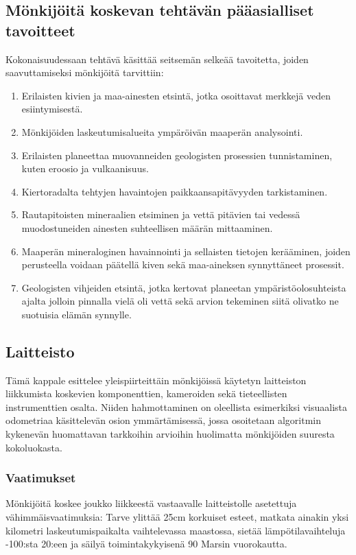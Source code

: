 \documentclass[finnish]{tktltiki2}
\theoremstyle{definition}
\theoremstyle{remark}
\begin{document}
\subsection{Mönkijöitä koskevan tehtävän pääasialliset tavoitteet}
Kokonaisuudessaan tehtävä käsittää seitsemän selkeää tavoitetta, joiden saavuttamiseksi mönkijöitä tarvittiin:
\begin{enumerate}
	\item Erilaisten kivien ja maa-ainesten etsintä, jotka osoittavat merkkejä veden esiintymisestä.
	\item Mönkijöiden laskeutumisalueita ympäröivän maaperän analysointi.
	\item Erilaisten planeettaa muovanneiden geologisten prosessien tunnistaminen, kuten eroosio ja vulkaanisuus.
	\item Kiertoradalta tehtyjen havaintojen paikkaansapitävyyden tarkistaminen.
	\item Rautapitoisten mineraalien etsiminen ja vettä pitävien tai vedessä muodostuneiden ainesten suhteellisen määrän mittaaminen.
	\item Maaperän mineraloginen havainnointi ja sellaisten tietojen kerääminen, joiden perusteella voidaan päätellä kiven sekä maa-aineksen synnyttäneet prosessit.
	\item Geologisten vihjeiden etsintä, jotka kertovat planeetan ympäristöolosuhteista ajalta jolloin pinnalla vielä oli vettä sekä arvion tekeminen siitä olivatko ne suotuisia elämän synnylle.
\end{enumerate}

\subsection{Laitteisto}
Tämä kappale esittelee yleispiirteittäin mönkijöissä käytetyn laitteiston liikkumista koskevien komponenttien, kameroiden sekä tieteellisten instrumenttien osalta. Niiden hahmottaminen on oleellista esimerkiksi visuaalista odometriaa käsittelevän osion ymmärtämisessä, jossa osoitetaan algoritmin kykenevän huomattavan tarkkoihin arvioihin huolimatta mönkijöiden suuresta kokoluokasta.

\subsubsection{Vaatimukset}
Mönkijöitä koskee joukko liikkeestä vastaavalle laitteistolle asetettuja vähimmäisvaatimuksia: Tarve ylittää 25cm korkuiset esteet, matkata ainakin yksi kilometri laskeutumispaikalta vaihtelevassa maastossa, sietää lämpötilavaihteluja -100\celsius:sta 20\celsius:een ja säilyä toimintakykyisenä 90 Marsin vuorokautta. \cite{lindemann2006mars}
\end{document}
